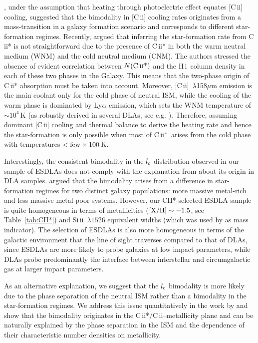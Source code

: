 \documentclass[fleqn,usenatbib,useAMS]{mnras}
\newcommand{\HI}{H\,{\sc i}}
\newcommand{\CII}{C\,{\sc ii}}
\newcommand{\SiII}{Si\,{\sc ii}}
\begin{document}
\citet{Wolfe2008}, under the assumption that 
heating through photoelectric effect equates [\CII] cooling, suggested that the bimodality in [\CII] cooling rates originates from a mass-transition in a galaxy formation scenario and corresponds to different star-formation regimes. 
Recently, \citet{Roy2017} argued that inferring the star-formation rate from \CII* is not straightforward due to the presence of \CII* in both the warm neutral medium (WNM) and the cold neutral medium (CNM). 
The authors stressed the absence of evident correlation between $N({\rm \text{\CII*}})$ and the \HI\ column density in each of these two phases in the Galaxy. This means that the two-phase origin of \CII* absorption must be taken into account.
Moreover, [\CII]~$\lambda$158$\mu$m emission is the main coolant only for the cold phase of neutral ISM, while the cooling of the warm phase is dominated by Ly$\alpha$ emission, which sets 
the WNM temperature of $\sim10^4$\,K (as robustly derived in several DLAs, see e.g. \citealt[][]{Carswell2012,Cooke2015,Noterdaeme2012c,Noterdaeme2021b}). 
Therefore, assuming dominant [\CII] cooling and thermal balance to derive the heating rate and hence the star-formation is only possible when most of \CII*\ arises from the cold phase with temperatures $< \rm few \times 100$\,K.

Interestingly, the consistent bimodality in the $l_{\rm c}$ distribution observed in our sample of ESDLAs does not comply with the explanation from \citet{Wolfe2008} about its origin in DLA samples. 
\citet{Wolfe2008} argued that the bimodality arises from a difference in star-formation regimes for two distinct galaxy populations: more massive metal-rich and less massive metal-poor systems. However, our CII*-selected ESDLA sample is quite homogeneous in terms of metallicities ($\rm [X/H]\sim-1.5$, see Table~\ref{tab:CII*}) and \SiII~$\lambda1526$ equivalent widths (which was used by \citeauthor{Wolfe2008} as mass indicator). The selection of ESDLAs is also more homogeneous in terms of the galactic environment that the line of sight traverses compared to that of DLAs, since ESDLAs are more likely to probe galaxies at low impact parameters, while DLAs probe predominantly the interface between interstellar and circumgalactic gas at larger impact parameters.

As an alternative explanation, we suggest that the $l_{\rm c}$ bimodality is more likely due to the phase separation of the neutral ISM rather than a bimodality in the star-formation regimes. We address this issue quantitatively in the work by \citet{Balashev2021} and show that the bimodality originates in the \CII*/\CII--metallicity plane and can be naturally explained by the phase separation in the ISM and the dependence of their characteristic number densities on metallicity. 
\end{document}
